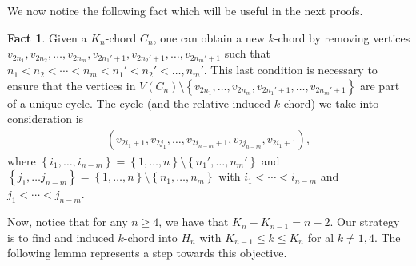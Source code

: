 \documentclass[12pt]{article}
\theoremstyle{definition}
\newtheorem{fact}[thm]{Fact}
\begin{document}
    We now notice the following fact
    which will be useful in the next proofs.

    \begin{fact} \label{fact:new}
        Given a $K_{n}$-chord 
        $C_{n}$, one can obtain
        a new $k$-chord by removing
        vertices $v_{2n_1}, 
        v_{2n_2}, \ldots,
        v_{2n_{m}}, v_{2n_1'+1}, 
        v_{2n_2'+1}, \ldots,
        v_{2n_{m}' + 1}$
        such that
        $n_1 < n_2 < \cdots
        < n_{m} < n_1' < n_2'
        < \ldots, n_{m}'$.
        This last condition is
        necessary to ensure that 
        the vertices in $V\left(C_{n}\right)
        \setminus \left\{
        v_{2n_1}, \ldots, 
        v_{2n_{m}},
        v_{2n_1'+1}, \ldots,
        v_{2n_{m}'+1}\right\}$
        are part of a unique cycle.
        The cycle (and the relative
        induced $k$-chord)
        we take into consideration is
        \begin{gather*}
            \left(v_{2i_1 + 1}, 
            v_{2j_1}, \ldots,
            v_{2i_{n-m}+1},
            v_{2j_{n-m}},
            v_{2i_1 + 1}\right),
        \end{gather*}
        where 
        $\left\{i_1, \ldots, i_{n-m}\right\} =
        \left\{1, \ldots, n\right\} \setminus 
        \left\{n_1', \ldots, n_{m}'\right\}$
        and
        $\left\{j_1, \ldots j_{n-m}\right\}
        = \left\{1, \ldots, n\right\}
        \setminus \left\{n_1, \ldots, n_{m}\right\}$ 
        with $i_1 < \cdots < i_{n-m}$
        and
        $j_1 < \cdots < j_{n-m}$.
    \end{fact}
    
    Now, notice that for any
    $n \geq 4$, we have that
    $K_{n} - K_{n-1} = n-2$.
    Our strategy is to find
    and induced $k$-chord
    into $H_{n}$ with
    $K_{n-1} \leq k \leq K_{n}$ 
    for al $k \neq 1,4$.
    The following lemma
    represents a step towards 
    this objective.
\end{document}
